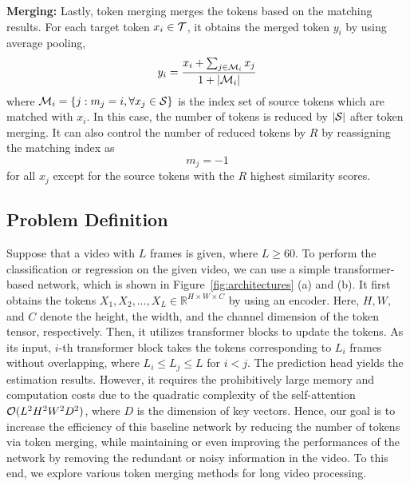 \documentclass{article}
\begin{document}
\vspace{0.1cm}
\noindent\textbf{Merging:} Lastly, token merging merges the tokens based on the matching results. For each target token $x_i \in {\cal T}$, it obtains the merged token $y_i$ by using average pooling,
\begin{equation} \label{eq:merging} 
    y_i = \frac{x_i + \sum_{j \in {\cal M}_i}{x_j}}{1 + |{\cal M}_i|} 
\end{equation}
where ${\cal M}_i = \{j : m_j = i, \forall x_j \in {\cal S}\}$ is the index set of source tokens which are matched with $x_i$. In this case, the number of tokens is reduced by $|\cal S|$ after token merging. It can also control the number of reduced tokens by $R$ by reassigning the matching index as
\begin{equation}
    m_j = -1
\end{equation}
for all $x_j$ except for the source tokens with the $R$ highest similarity scores. 

\subsection{Problem Definition}
\vspace*{-0.2cm}
Suppose that a video with $L$ frames is given, where $L \geq 60$. To perform the classification or regression on the given video, we can use a simple transformer-based network, which is shown in Figure~\ref{fig:architectures} (a) and (b). It first obtains the tokens $X_1, X_2, \ldots, X_L \in \mathbb{R}^{H \times W \times C}$ by using an encoder. Here, $H, W,$ and $C$ denote the height, the width, and the channel dimension of the token tensor, respectively. Then, it utilizes transformer blocks to update the tokens. As its input, $i$-th transformer block takes the tokens corresponding to $L_i$ frames without overlapping, where $L_i \leq L_j \leq L$ for $i < j$. The prediction head yields the estimation results. However, it requires the prohibitively large memory and computation costs due to the quadratic complexity of the self-attention ${\cal O}(L^2H^2W^2D^2)$, where $D$ is the dimension of key vectors. Hence, our goal is to increase the efficiency of this baseline network by reducing the number of tokens via token merging, while maintaining or even improving the performances of the network by removing the redundant or noisy information in the video. To this end, we explore various token merging methods for long video processing. 

\vspace*{-0.2cm}
\end{document}

